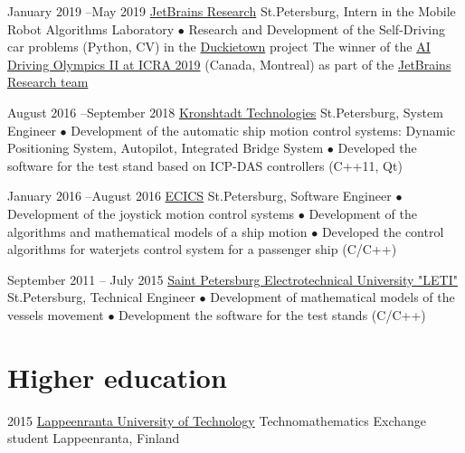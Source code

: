 \documentclass[11pt,a4paper]{moderncv}
\def\mark{{\small$\bullet$} }
\begin{document}
\cventry
    {January 2019 --\newline May 2019} %
    {\href{https://research.jetbrains.org/groups/robolab} {JetBrains Research}}
    {St.Petersburg, Intern in the Mobile Robot Algorithms Laboratory}
    {}
    {}
    {
        \mark Research and Development of the Self-Driving car problems (Python, CV) in the
        {\href{https://www.duckietown.org/archives/37690}{Duckietown}} project
        \newline \mark The winner of the {\href{https://www.icra2019.org/competitions/ai-driving-olympics-ai-do}
        {AI Driving Olympics II at ICRA 2019}} (Canada, Montreal) as part of the
        \href{https://research.jetbrains.org/ru/news/the-team-jbrrussia-won-ai-driving-olympics-at-icra2019}
        {JetBrains Research team}
    }

\cventry
    {August 2016 --\newline September 2018} %
    {\href{https://kronshtadt.ru/}{Kronshtadt Technologies}}
    {St.Petersburg, System Engineer}
    {}
    {}
    {
        \mark Development of the automatic ship motion control systems:
              Dynamic Positioning System, Autopilot, Integrated Bridge System
        \newline
        \mark Developed the software for the test stand based on ICP-DAS controllers (C++11, Qt)
    }

\cventry
    {January 2016 --\newline August 2016} %
    {\href{http://www.ec-ics.ru/}{ECICS}}
    {St.Petersburg, Software Engineer}
    {}
    {}
    {
        \mark Development of the joystick motion control systems
        \newline
        \mark Development of the algorithms and mathematical models of a ship motion
        \newline
        \mark Developed the control algorithms for waterjets control system for a passenger ship (C/C++)
    }

\cventry
    {September 2011 -- July 2015} %
    {\href{https://etu.ru/}{Saint Petersburg Electrotechnical University "LETI"}}
    {\newline St.Petersburg, Technical Engineer}
    {}
    {}
    {
        \mark Development of mathematical models of the vessels movement
        \newline
        \mark Development the software for the test stands (C/C++)
    }

\pagebreak

\section{Higher education}
\cventry
    {2015}
    {\href{https://www.lut.fi/web/en/}{Lappeenranta University of Technology}}
    {Technomathematics}
    {\newline Exchange student}
    {}
    {Lappeenranta, Finland}
\end{document}
